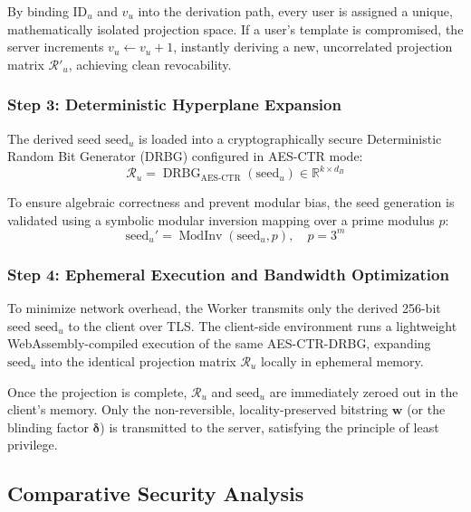 \documentclass[11pt,twoside]{amsart}
\theoremstyle{plain}
\theoremstyle{definition}
\theoremstyle{remark}
\DeclareMathOperator{\ModInv}{ModInv}
\DeclareMathOperator{\DRBG}{DRBG}
\newcommand{\bw}{\mathbf{w}}
\newcommand{\bdelta}{\boldsymbol{\delta}}
\newcommand{\calR}{\mathcal{R}}
\newcommand{\bbR}{\mathbb{R}}
\begin{document}
By binding $\text{ID}_u$ and $v_u$ into the derivation path, every user is assigned a unique, mathematically isolated projection space. If a user's template is compromised, the server increments $v_u \leftarrow v_u + 1$, instantly deriving a new, uncorrelated projection matrix $\calR'_u$, achieving clean revocability.

\subsubsection{Step 3: Deterministic Hyperplane Expansion}

The derived seed $\text{seed}_u$ is loaded into a cryptographically secure Deterministic Random Bit Generator (DRBG) configured in AES-CTR mode:
\begin{equation}
\calR_u = \DRBG_{\text{AES-CTR}}(\text{seed}_u) \in \bbR^{k \times d_B}
\end{equation}

To ensure algebraic correctness and prevent modular bias, the seed generation is validated using a symbolic modular inversion mapping over a prime modulus $p$:
\begin{equation}
\text{seed}_u' = \ModInv(\text{seed}_u, p), \quad p = 3^m
\end{equation}

\subsubsection{Step 4: Ephemeral Execution and Bandwidth Optimization}

To minimize network overhead, the Worker transmits only the derived 256-bit seed $\text{seed}_u$ to the client over TLS. The client-side environment runs a lightweight WebAssembly-compiled execution of the same AES-CTR-DRBG, expanding $\text{seed}_u$ into the identical projection matrix $\calR_u$ locally in ephemeral memory.

Once the projection is complete, $\calR_u$ and $\text{seed}_u$ are immediately zeroed out in the client's memory. Only the non-reversible, locality-preserved bitstring $\bw$ (or the blinding factor $\bdelta$) is transmitted to the server, satisfying the principle of least privilege.

\subsection{Comparative Security Analysis}
\end{document}
